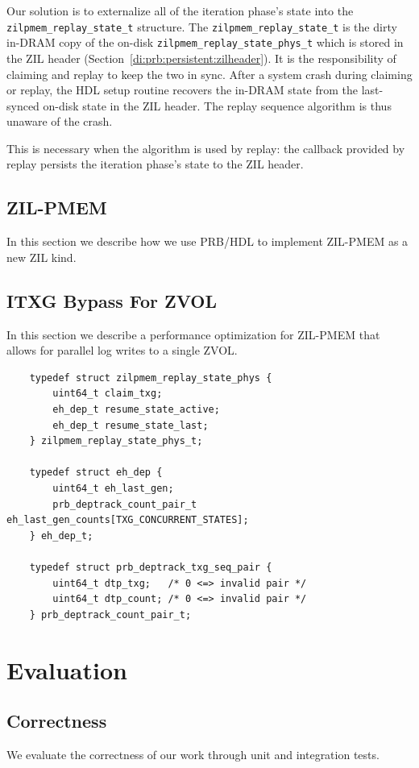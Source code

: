 \documentclass[12pt,a4paper,twoside]{book}
\begin{document}
Our solution is to externalize all of the iteration phase's state into the \lstinline{zilpmem_replay_state_t} structure.
The \lstinline{zilpmem_replay_state_t} is the dirty in-DRAM copy of the on-disk \lstinline{zilpmem_replay_state_phys_t} which is stored in the ZIL header (Section~\ref{di:prb:persistent:zilheader}).
It is the responsibility of claiming and replay to keep the two in sync.
After a system crash during claiming or replay, the HDL setup routine recovers the in-DRAM state from the last-synced on-disk state in the ZIL header.
The replay sequence algorithm is thus unaware of the crash.

This is necessary when the algorithm is used by replay: the callback provided by replay persists the iteration phase's state to the ZIL header.



\section{ZIL-PMEM}\label{sec:zilpmem}
In this section we describe how we use PRB/HDL to implement ZIL-PMEM as a new ZIL kind.

\section{ITXG Bypass For ZVOL}\label{sec:itxgbypass}
In this section we describe a performance optimization for ZIL-PMEM that allows for parallel log writes to a single ZVOL.



\begin{lstlisting}
    typedef struct zilpmem_replay_state_phys {
        uint64_t claim_txg;
        eh_dep_t resume_state_active;
        eh_dep_t resume_state_last;
    } zilpmem_replay_state_phys_t;
    
    typedef struct eh_dep {
        uint64_t eh_last_gen;
        prb_deptrack_count_pair_t eh_last_gen_counts[TXG_CONCURRENT_STATES];
    } eh_dep_t;
    
    typedef struct prb_deptrack_txg_seq_pair {
        uint64_t dtp_txg;	/* 0 <=> invalid pair */
        uint64_t dtp_count;	/* 0 <=> invalid pair */
    } prb_deptrack_count_pair_t;
    \end{lstlisting}
    

\chapter{Evaluation}\label{ch:eval}
\section{Correctness}
We evaluate the correctness of our work through unit and integration tests.
\end{document}

